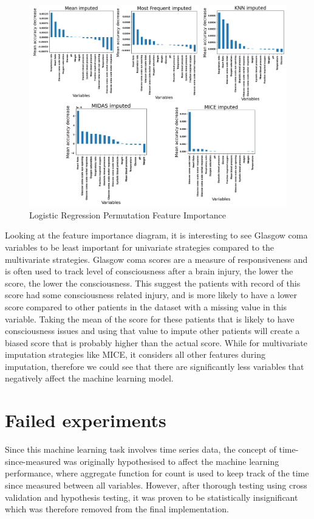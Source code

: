 \documentclass{l4proj}
\begin{document}
 \begin{figure}[!htb]
  \caption{Logistic Regression Permutation Feature Importance }
  \includegraphics[width=\textwidth]{dissertation/Latex/images/Classification Results/lg_feature_importance.PNG}
\end{figure}


Looking at the feature importance diagram, it is interesting to see Glasgow coma variables to be least important for univariate strategies compared to the multivariate strategies. Glasgow coma scores are a measure of responsiveness and is often used to track level of consciousness after a brain injury, the lower the score, the lower the consciousness. This suggest the patients with record of this score had some consciousness related injury, and is more likely to have a lower score compared to other patients in the dataset with a missing value in this variable. Taking the mean of the score for these patients that is likely to have consciousness issues and using that value to impute other patients will create a biased score that is probably higher than the actual score. While for multivariate imputation strategies like MICE, it considers all other features during imputation, therefore we could see that there are significantly less variables that negatively affect the machine learning model. 

\section{Failed experiments}
Since this machine learning task involves time series data, the concept of time-since-measured was originally hypothesised to affect the machine learning performance, where aggregate function for count is used to keep track of the time since measured between all variables. However, after thorough testing using cross validation and hypothesis testing, it was proven to be statistically insignificant which was therefore removed from the final implementation.
\end{document}
